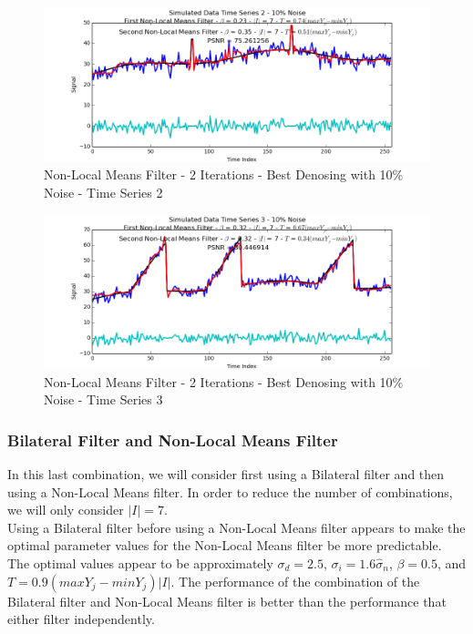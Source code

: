 \documentclass[11pt]{article}
\theoremstyle{definition}
\begin{document}
\begin{figure}
\centering
\includegraphics[width = 0.75 \textwidth]{MultiNLMeansSignal2Best.png}
\caption{Non-Local Means Filter - 2 Iterations - Best Denosing with 10\% Noise - Time Series 2}
\label{multinlmeans2best}
\end{figure}

\begin{figure}
\centering
\includegraphics[width = 0.75 \textwidth]{MultiNLMeansSignal3Best.png}
\caption{Non-Local Means Filter - 2 Iterations - Best Denosing with 10\% Noise - Time Series 3}
\label{multinlmeans3best}
\end{figure}

\newpage


\subsubsection{Bilateral Filter and Non-Local Means Filter}

In this last combination, we will consider first using a Bilateral filter and then using a Non-Local Means filter. In order to reduce the number of combinations, we will only consider $\lvert I \rvert = 7$.\\

Using a Bilateral filter before using a Non-Local Means filter appears to make the optimal parameter values for the Non-Local Means filter be more predictable. The optimal values appear to be approximately $\sigma_d = 2.5$, $\sigma_i = 1.6 \hat{\sigma}_n$, $\beta = 0.5$, and $T = 0.9 \left( max Y_j - min Y_j \right) \lvert I \rvert$. The performance of the combination of the Bilateral filter and Non-Local Means filter is better than the performance that either filter independently.
\end{document}
